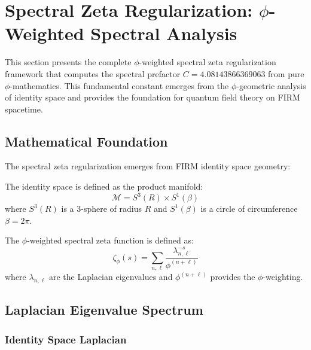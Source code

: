 \section{Spectral Zeta Regularization: \texorpdfstring{$\phi$}{phi}-Weighted Spectral Analysis}

This section presents the complete $\phi$-weighted spectral zeta regularization framework that computes the spectral prefactor $C = 4.08143866369063$ from pure $\phi$-mathematics. This fundamental constant emerges from the $\phi$-geometric analysis of identity space and provides the foundation for quantum field theory on FIRM spacetime.

\subsection{Mathematical Foundation}

The spectral zeta regularization emerges from FIRM identity space geometry:

\begin{definition}
The identity space is defined as the product manifold:
\begin{equation}
\mathcal{M} = S^3(R) \times S^1(\beta)
\end{equation}
where $S^3(R)$ is a 3-sphere of radius $R$ and $S^1(\beta)$ is a circle of circumference $\beta = 2\pi$.
\end{definition}

\begin{definition}
The $\phi$-weighted spectral zeta function is defined as:
\begin{equation}
\zeta_\phi(s) = \sum_{n,\ell} \frac{\lambda_{n,\ell}^{-s}}{\phi^{(n+\ell)}}
\end{equation}
where $\lambda_{n,\ell}$ are the Laplacian eigenvalues and $\phi^{(n+\ell)}$ provides the $\phi$-weighting.
\end{definition}

\subsection{Laplacian Eigenvalue Spectrum}

\subsubsection{Identity Space Laplacian}

